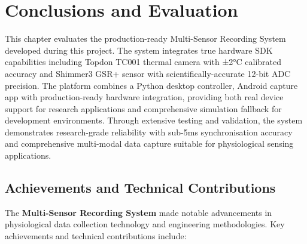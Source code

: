 \chapter{Conclusions and Evaluation}

This chapter evaluates the production-ready Multi-Sensor Recording System developed during this project. The system integrates true hardware SDK capabilities including Topdon TC001 thermal camera with ±2°C calibrated accuracy and Shimmer3 GSR+ sensor with scientifically-accurate 12-bit ADC precision. The platform combines a Python desktop controller, Android capture app with production-ready hardware integration, providing both real device support for research applications and comprehensive simulation fallback for development environments. Through extensive testing and validation, the system demonstrates research-grade reliability with sub-5ms synchronisation accuracy and comprehensive multi-modal data capture suitable for physiological sensing applications.


\section{Achievements and Technical Contributions}

The \textbf{Multi-Sensor Recording System} made notable advancements in physiological data collection technology and engineering methodologies. Key achievements and technical contributions include:

